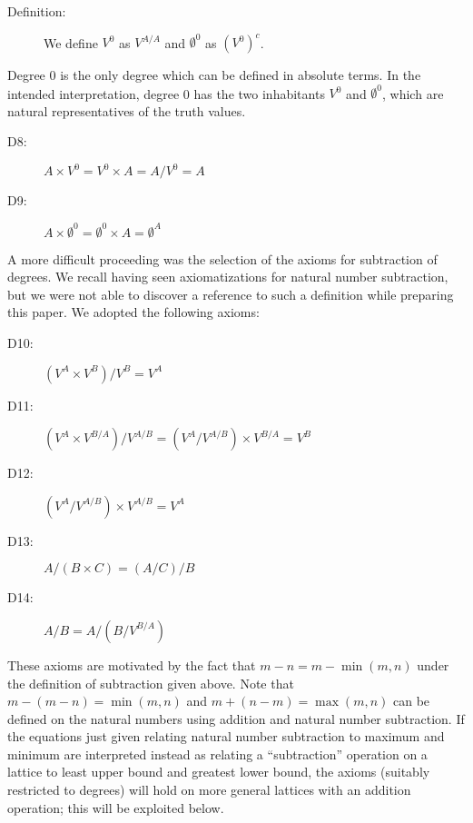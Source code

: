\begin{description}

\item[Definition:]

We define $V^0$ as $V^{A/A}$ and $\emptyset^0$ as $(V^0)^c$.

\end{description}
Degree 0 is the only degree which can be defined in absolute terms.
In the intended interpretation, degree 0 has the two inhabitants $V^0$
and $\emptyset^0$, which are natural representatives of the truth
values.

\begin{description}

\item[D8:] $A \times V^0 = V^0 \times A = A/V^0 = A$

\item[D9:]  $A \times \emptyset^0 = \emptyset^0 \times A = \emptyset^A$

\end{description}

A more difficult proceeding was the selection of the axioms for
subtraction of degrees.  We recall having seen axiomatizations for
natural number subtraction, but we were not able to discover a
reference to such a definition while preparing this paper.  We adopted
the following axioms:

\begin{description}



\item[D10:] $(V^A \times V^B)/V^B = V^A$

\item[D11:]  $(V^A \times V^{B/A})/V^{A/B} = (V^A/V^{A/B})\times V^{B/A} = V^B$

\item[D12:]  $(V^A/V^{A/B}) \times V^{A/B} = V^A$

\item[D13:]  $A/(B\times C) = (A/C)/B$

\item[D14:] $A/B = A/(B/V^{B/A})$

\end{description}

These axioms are motivated by the fact that $m-n = m-\min(m,n)$ under
the definition of subtraction given above.  Note that $m-(m-n) =
\min(m,n)$ and $m+(n-m) = \max(m,n)$ can be defined on the natural
numbers using addition and natural number subtraction.  If the
equations just given relating natural number subtraction to maximum
and minimum are interpreted instead as relating a ``subtraction''
operation on a lattice to least upper bound and greatest lower bound,
the axioms (suitably restricted to degrees) will hold on more general
lattices with an addition operation; this will be exploited below.

